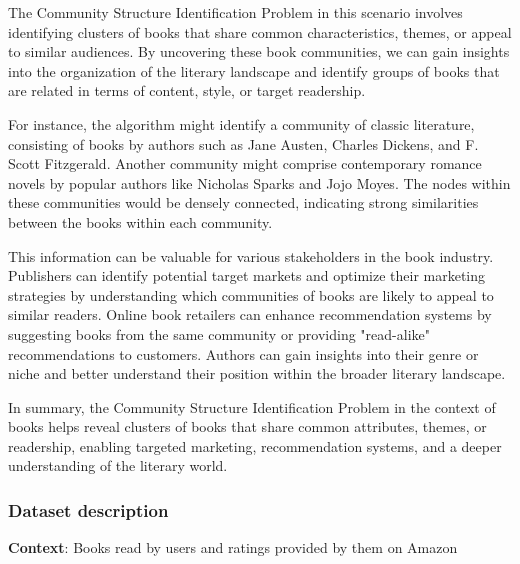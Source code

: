 The Community Structure Identification Problem in this scenario involves identifying clusters of books that share common characteristics, themes, or appeal to similar audiences. By uncovering these book communities, we can gain insights into the organization of the literary landscape and identify groups of books that are related in terms of content, style, or target readership.

For instance, the algorithm might identify a community of classic literature, consisting of books by authors such as Jane Austen, Charles Dickens, and F. Scott Fitzgerald. Another community might comprise contemporary romance novels by popular authors like Nicholas Sparks and Jojo Moyes. The nodes within these communities would be densely connected, indicating strong similarities between the books within each community.

This information can be valuable for various stakeholders in the book industry. Publishers can identify potential target markets and optimize their marketing strategies by understanding which communities of books are likely to appeal to similar readers. Online book retailers can enhance recommendation systems by suggesting books from the same community or providing "read-alike" recommendations to customers. Authors can gain insights into their genre or niche and better understand their position within the broader literary landscape.

In summary, the Community Structure Identification Problem in the context of books helps reveal clusters of books that share common attributes, themes, or readership, enabling targeted marketing, recommendation systems, and a deeper understanding of the literary world.

\subsubsection{Dataset description}

\textbf{Context}: Books read by users and ratings provided by them on Amazon

